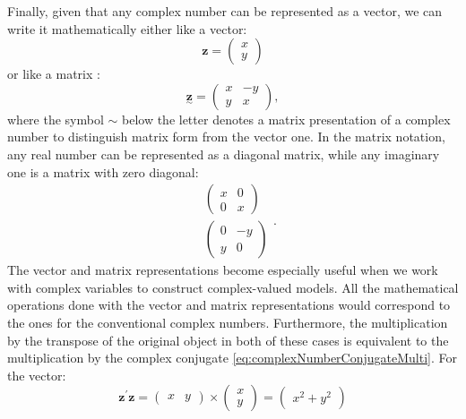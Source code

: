 \documentclass[
]{book}
\begin{document}
Finally, given that any complex number can be represented as a vector, we can write it mathematically either like a vector:
\begin{equation}
    \boldsymbol{z} = \begin{pmatrix} x \\ y \end{pmatrix}
    \label{eq:complexNumberVectors}
\end{equation}
or like a matrix \citep[ provides some examples based on these presentations]{Halliwell2015}:
\begin{equation}
    \underset{\sim}{\boldsymbol{z}} = \begin{pmatrix} x & -y \\ y & x \end{pmatrix} ,
    \label{eq:complexNumberMatrix}
\end{equation}
where the symbol \(\sim\) below the letter denotes a matrix presentation of a complex number to distinguish matrix form from the vector one. In the matrix notation, any real number can be represented as a diagonal matrix, while any imaginary one is a matrix with zero diagonal:
\begin{equation*}
    \begin{aligned}
        & \begin{pmatrix} x & 0 \\ 0 & x \end{pmatrix} \\
        & \begin{pmatrix} 0 & -y \\ y & 0 \end{pmatrix}
    \end{aligned} .
\end{equation*}
The vector and matrix representations become especially useful when we work with complex variables to construct complex-valued models. All the mathematical operations done with the vector and matrix representations would correspond to the ones for the conventional complex numbers. Furthermore, the multiplication by the transpose of the original object in both of these cases is equivalent to the multiplication by the complex conjugate \eqref{eq:complexNumberConjugateMulti}. For the vector:
\begin{equation}
    \boldsymbol{z}^\prime \boldsymbol{z} = \begin{pmatrix} x & y \end{pmatrix} \times \begin{pmatrix} x \\ y \end{pmatrix} = \begin{pmatrix} x^2 + y^2 \end{pmatrix}
    \label{eq:complexNumberVectorsMulti}
\end{equation}
\end{document}
